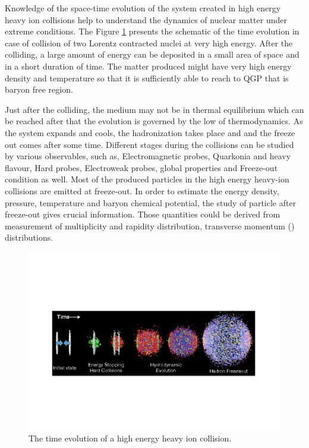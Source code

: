 Knowledge of the space-time evolution of the system created in high energy heavy ion collisions help to understand the dynamics of nuclear matter under extreme conditions. 
The Figure \ref{fig:HI} presents the schematic of the time evolution in case of collision of two Lorentz contracted nuclei at very high energy. After the colliding, a large amount of energy can be deposited in a small area of space and in a short duration of time. The matter produced might have very high energy density and temperature so that it is sufficiently able to reach to QGP that is baryon free region.

Just after the colliding, the medium may not be in thermal equilibrium which can be reached after that the evolution is governed by the low of thermodynamics. As the system expands and cools, the hadronization takes place and and the freeze out comes after some time.
Different stages during the collisions can be studied by various observables, such as, Electromagnetic probes,  Quarkonia and heavy flavour, Hard probes, Electroweak probes, global properties and Freeze-out condition as well. Most of the produced particles in the high energy heavy-ion collisions are emitted at freeze-out. In order to estimate the energy density, pressure, temperature and baryon chemical potential, the study of particle after freeze-out gives crucial information. Those quantities could be derived from measurement of multiplicity and rapidity distribution, transverse momentum (\pt) distributions.


\begin{figure}[htbp]
\begin{center}
\includegraphics[width=12.cm]{./Version1/FigChapter1/HI}
\caption{The time evolution of a high energy heavy ion collision. \cite{cite:HI}}
\label{fig:HI}
\end{center}
\end{figure}

